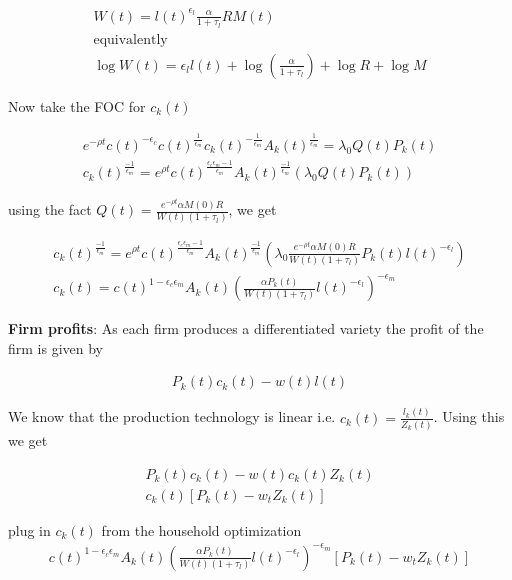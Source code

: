   \begin{align}
     W(t) = l(t)^{\epsilon_l} \frac{\alpha}{1+\tau_l} R M(t) \\
     \text{equivalently} \\
     \log W(t) = \epsilon_l l(t) + \log \left( \frac{\alpha}{1+\tau_l} \right) + \log R + \log M
  \end{align}

Now take the FOC for $c_k(t)$

\begin{align}
   e^{- \rho t} c(t)^{- \epsilon_c} c(t)^{\frac{1}{\epsilon_m}} c_k(t)^{-\frac{1}{\epsilon_m}} A_k(t)^{\frac{1}{\epsilon_m}} = \lambda_0 Q(t)P_k(t) \\
   c_k(t)^{\frac{-1}{\epsilon_m}} = e^{\rho t} c(t)^{\frac{\epsilon_c \epsilon_m - 1}{\epsilon_m}} A_k(t)^{\frac{-1}{\epsilon_m}} \left( \lambda_0 Q(t)P_k(t) \right)
\end{align}

using the fact $Q(t) = \frac{ e^{- \rho t} \alpha M(0)R}{W(t) (1+\tau_l)}$, we get

\begin{align}
  c_k(t)^{\frac{-1}{\epsilon_m}} = e^{\rho t} c(t)^{\frac{\epsilon_c \epsilon_m - 1}{\epsilon_m}} A_k(t)^{\frac{-1}{\epsilon_m}} \left( \lambda_0  \frac{ e^{- \rho t} \alpha M(0)R}{W(t) (1+\tau_l)}P_k(t) l(t)^{-\epsilon_l} \right) \\
  c_k(t) =  c(t)^{1-\epsilon_c \epsilon_m} A_k(t) \left(   \frac{ \alpha P_k(t) }{W(t) (1+\tau_l)} l(t)^{-\epsilon_l} \right)^{- \epsilon_m}
\end{align}

\textbf{Firm profits}: As each firm produces a differentiated variety the profit of the firm is given by

\begin{align}
  P_k(t) c_k(t) - w(t) l(t)
\end{align}

We know that the production technology is linear i.e. $c_k(t) = \frac{l_k(t)}{Z_k(t)}$. Using this we get

\begin{align}
  P_k(t) c_k(t) - w(t) c_k(t) Z_k(t) \\
  c_k(t) \left[ P_k(t) - w_t Z_k(t) \right]
\end{align}

plug in $c_k(t)$ from the household optimization
\begin{align}
c(t)^{1-\epsilon_c \epsilon_m} A_k(t) \left(   \frac{ \alpha P_k(t) }{W(t) (1+\tau_l)} l(t)^{-\epsilon_l} \right)^{- \epsilon_m}  \left[ P_k(t) - w_t Z_k(t) \right]
\end{align}


